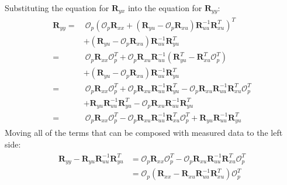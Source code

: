 \documentclass[letterpaper,10pt,english]{sphinxmanual}
\begin{document}
\sphinxAtStartPar
Substituting the equation for \(\mathbf{R}_{yx}\) into the equation
for \(\mathbf{R}_{yy}\):
\begin{equation*}
\begin{split}\begin{aligned}
\mathbf{R}_{yy} =& ~\mathcal{O}_{p}
\left(\mathcal{O}_{p}\mathbf{R}_{xx} + \left( \mathbf{R}_{yu} - \mathcal{O}_{p}\mathbf{R}_{xu} \right)\mathbf{R}_{uu}^{-1}\mathbf{R}_{xu}^{T}\right)^{T}
\\
&+
\left( \mathbf{R}_{yu} - \mathcal{O}_{p}\mathbf{R}_{xu} \right)\mathbf{R}_{uu}^{-1}\mathbf{R}_{yu}^{T}
\\
=& ~\mathcal{O}_{p}\mathbf{R}_{xx}\mathcal{O}_{p}^{T}
 + \mathcal{O}_{p}\mathbf{R}_{xu}\mathbf{R}_{uu}^{-1} \left( \mathbf{R}_{yu}^{T} - \mathbf{R}_{xu}^{T}\mathcal{O}_{p}^{T} \right)
\\
&+
\left( \mathbf{R}_{yu} - \mathcal{O}_{p}\mathbf{R}_{xu} \right)\mathbf{R}_{uu}^{-1}\mathbf{R}_{yu}^{T}
\\
=& ~\mathcal{O}_{p}\mathbf{R}_{xx}\mathcal{O}_{p}^{T}
 + \mathcal{O}_{p}\mathbf{R}_{xu}\mathbf{R}_{uu}^{-1}  \mathbf{R}_{yu}^{T} - \mathcal{O}_{p}\mathbf{R}_{xu}\mathbf{R}_{uu}^{-1} \mathbf{R}_{xu}^{T}\mathcal{O}_{p}^{T}
\\
&+
 \mathbf{R}_{yu}\mathbf{R}_{uu}^{-1}\mathbf{R}_{yu}^{T} - \mathcal{O}_{p}\mathbf{R}_{xu} \mathbf{R}_{uu}^{-1}\mathbf{R}_{yu}^{T}
\\
=& ~\mathcal{O}_{p}\mathbf{R}_{xx}\mathcal{O}_{p}^{T}
 - \mathcal{O}_{p}\mathbf{R}_{xu}\mathbf{R}_{uu}^{-1} \mathbf{R}_{xu}^{T}\mathcal{O}_{p}^{T} +
 \mathbf{R}_{yu}\mathbf{R}_{uu}^{-1}\mathbf{R}_{yu}^{T}
\end{aligned}\end{split}
\end{equation*}
\sphinxAtStartPar
Moving all of the terms that can be composed with measured data to the
left side:
\begin{equation*}
\begin{split}\begin{aligned}
\mathbf{R}_{yy} - \mathbf{R}_{yu}\mathbf{R}_{uu}^{-1}\mathbf{R}_{yu}^{T}
&= \mathcal{O}_{p}\mathbf{R}_{xx}\mathcal{O}_{p}^{T} - \mathcal{O}_{p}\mathbf{R}_{xu}\mathbf{R}_{uu}^{-1} \mathbf{R}_{xu}^{T}\mathcal{O}_{p}^{T} \\
&= \mathcal{O}_{p}\left( \mathbf{R}_{xx} - \mathbf{R}_{xu}\mathbf{R}_{uu}^{-1} \mathbf{R}_{xu}^{T} \right) \mathcal{O}_{p}^{T}
\end{aligned}\end{split}
\end{equation*}
\end{document}
